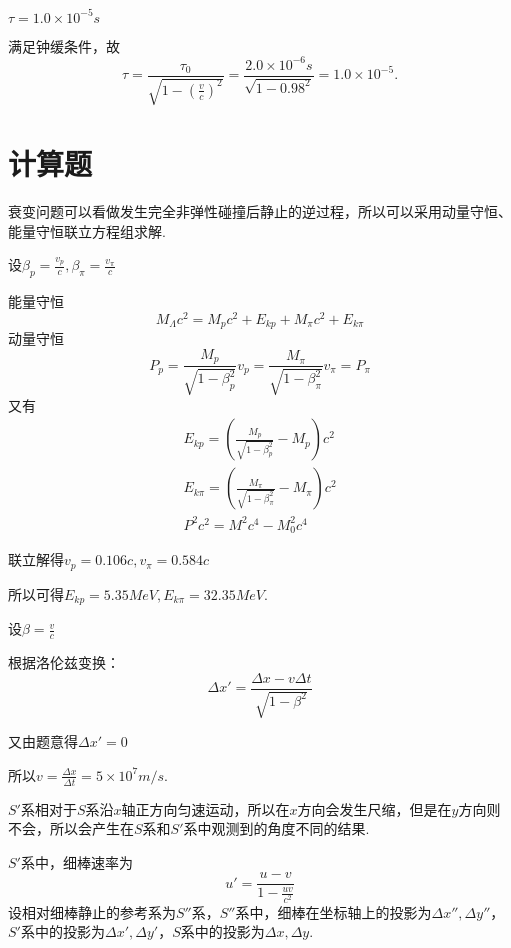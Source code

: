 \documentclass[b5paper,opensource]{./template/qyxf-book}
\begin{document}
$\tau=1.0\times10^{-5}s$

\solve
满足钟缓条件，故
\begin{equation*}
\tau=\frac{\tau_0}{\sqrt{1-(\frac{v}{c})^2}}=\frac{2.0\times10^{-6}s}{\sqrt{1-0.98^2}}=1.0\times10^{-5}.
\end{equation*}


\section{计算题}

\analysis
衰变问题可以看做发生完全非弹性碰撞后静止的逆过程，所以可以采用动量守恒、能量守恒联立方程组求解.

\solve 
设$\beta_p=\frac{v_p}{c},\beta_\pi=\frac{v_\pi}{c}$

能量守恒
\begin{equation*}
M_\Lambda c^2=M_pc^2+E_{kp}+M_\pi c^2+E_{k\pi}
\end{equation*}
动量守恒
\begin{equation*}
P_p=\frac{M_p}{\sqrt{1-\beta_p^2}}v_p=\frac{M_\pi}{\sqrt{1-\beta_\pi^2}}v_\pi=P_\pi
\end{equation*}
又有
\begin{align*}
E_{kp}=(\frac{M_p}{\sqrt{1-\beta_p^2}}-M_p)c^2\\
E_{k\pi}=(\frac{M_\pi}{\sqrt{1-\beta_\pi^2}}-M_\pi)c^2\\
P^2c^2=M^2c^4-M_0^2c^4
\end{align*}

联立解得$v_p=0.106c,v_\pi=0.584c$

所以可得$E_{kp}=5.35MeV,E_{k\pi}=32.35MeV$.


\solve 
设$\beta=\frac{v}{c}$

根据洛伦兹变换：
\begin{equation*}
\Delta x'=\frac{\Delta x-v\Delta t}{\sqrt{1-\beta^2}}
\end{equation*}

又由题意得$\Delta x'=0$

所以$v=\frac{\Delta x}{\Delta t}=5\times10^7m/s$.


\analysis
$S'$系相对于$S$系沿$x$轴正方向匀速运动，所以在$x$方向会发生尺缩，但是在$y$方向则不会，所以会产生在$S$系和$S'$系中观测到的角度不同的结果.

\solve
$S'$系中，细棒速率为
\begin{equation*}
u'=\frac{u-v}{1-\frac{uv}{c^2}}
\end{equation*}
设相对细棒静止的参考系为$S''$系，$S''$系中，细棒在坐标轴上的投影为$\Delta x'',\Delta y''$，$S'$系中的投影为$\Delta x',\Delta y'$，$S$系中的投影为$\Delta x,\Delta y$.
\end{document}
